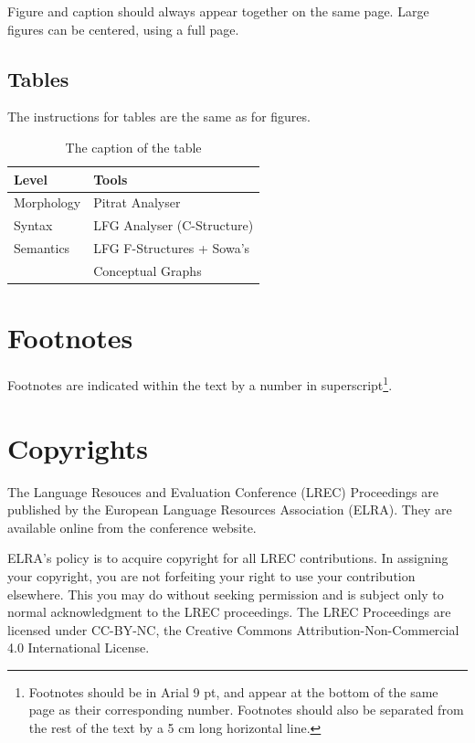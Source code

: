 \documentclass[10pt, a4paper]{article}
\begin{document}
Figure and caption should always appear together on the same page. Large figures can be centered, using a full page.

\subsection{Tables}

The instructions for tables are the same as for figures.

\begin{table}[!ht]
\begin{center}
\begin{tabularx}{\columnwidth}{|l|X|}
      \hline
      Level&Tools\\
      \hline
      Morphology & Pitrat Analyser\\
      \hline
      Syntax & LFG Analyser (C-Structure)\\
      \hline
     Semantics & LFG F-Structures + Sowa's\\
     & Conceptual Graphs\\
      \hline

\end{tabularx}
\caption{The caption of the table}
 \end{center}
\end{table}

\section{Footnotes}

Footnotes are indicated within the text by a number in superscript\footnote{Footnotes should be in Arial 9 pt, and appear at the bottom of the same page as their corresponding number. Footnotes should also be separated from the rest of the text by a 5 cm long horizontal line.}.

\section{Copyrights}

The Language Resouces and Evaluation Conference (LREC) Proceedings are published by the European Language Resources Association (ELRA). They are available online from the conference website.

ELRA's policy is to acquire copyright for all LREC contributions. In assigning your copyright, you are not forfeiting your right to use your contribution elsewhere. This you may do without seeking permission and is subject only to normal acknowledgment to the LREC proceedings. The LREC Proceedings are licensed under CC-BY-NC, the Creative Commons Attribution-Non-Commercial 4.0 International License.
\end{document}

